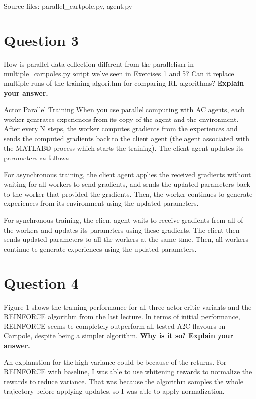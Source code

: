 \documentclass[12pt]{article}
\begin{document}
\noindent
Source files: parallel\_cartpole.py, agent.py

\pagebreak


\section*{Question 3}

How is parallel data collection different from the parallelism in
multiple\_cartpoles.py script we’ve seen in Exercises 1 and 5? Can it replace multiple runs of
the training algorithm for comparing RL algorithms? \textbf{Explain your answer.}
\newline


Actor Parallel Training
When you use parallel computing with AC agents, each worker generates experiences from its copy of the agent and the environment. After every N steps, the worker computes gradients from the experiences and sends the computed gradients back to the client agent (the agent associated with the MATLAB® process which starts the training). The client agent updates its parameters as follows.
\newline

For asynchronous training, the client agent applies the received gradients without waiting for all workers to send gradients, and sends the updated parameters back to the worker that provided the gradients. Then, the worker continues to generate experiences from its environment using the updated parameters.
\newline

For synchronous training, the client agent waits to receive gradients from all of the workers and updates its parameters using these gradients. The client then sends updated parameters to all the workers at the same time. Then, all workers continue to generate experiences using the updated parameters.


\section*{Question 4}

Figure 1 shows the training performance for all three actor-critic
variants and the REINFORCE algorithm from the last lecture. In terms of initial performance,
REINFORCE seems to completely outperform all tested A2C flavours on Cartpole, despite being
a simpler algorithm. \textbf{Why is it so? Explain your answer.}
\newline

An explanation for the high variance could be because of the returns. For REINFORCE with baseline, I was able to use whitening rewards to normalize the rewards to reduce variance. That was because the algorithm samples the whole trajectory before applying updates, so I was able to apply normalization. 
\end{document}
